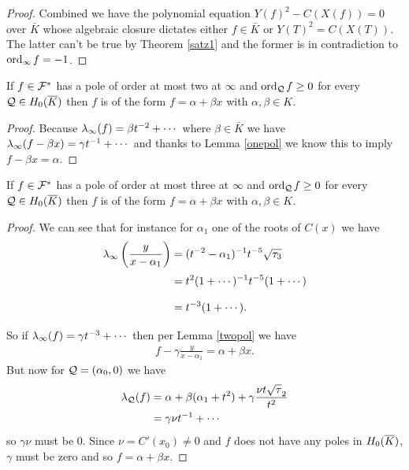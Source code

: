 \documentclass[english,11pt,a4paper]{article}
\begin{document}
\begin{lemma}
\begin{proof}
    Combined we have the polynomial equation $Y(f)^2 - C(X(f)) = 0$ over $\bar K$ whose algebraic closure dictates either $f \in \bar K$ or $Y(T)^2 = C(X(T))$. The latter can't be true by Theorem \ref{satz1} and the former is in contradiction to $\text{ord}_{\infty}\hspace{0.4mm} f = -1$.%
  \end{proof}
\end{lemma}

\begin{lemma}\label{twopol}
  If $f \in \mathcal{F}^*$ has a pole of order at most two at $\infty$ and $\text{ord}_{\mathcal{Q}}\hspace{0.4mm} f \geq 0$ for every $\mathcal{Q} \in H_0(\overline K)$ then $f$ is of the form $f = \alpha + \beta x$ with $\alpha, \beta \in K$.
  \begin{proof}
    Because $\lambda_{\infty} (f) = \beta t^{-2} + \cdots$ where $\beta \in \bar K$ we have $\lambda_{\infty} (f - \beta x)= \gamma t^{-1} + \cdots$ and thanks to Lemma \ref{onepol} we know this to imply $f - \beta x = \alpha$.
  \end{proof}
\end{lemma}

\begin{lemma}
  If $f \in \mathcal{F}^*$ has a pole of order at most three at $\infty$ and $\text{ord}_{\mathcal{Q}}\hspace{0.4mm} f \geq 0$ for every $\mathcal{Q} \in H_0(\overline K)$ then $f$ is of the form $f = \alpha + \beta x$ with $\alpha, \beta \in K$.
  \begin{proof}
    We can see that for instance for $\alpha_1$ one of the roots of $C(x)$ we have
    \begin{align*}
      \lambda_{\infty} \left(\frac{y}{x-\alpha_1}\right) &= (t^{-2} - \alpha_1)^{-1} t^{-5} \sqrt{\tau_3}\\
      \vphantom{\frac x y}
      &= t^2 (1 + \cdots)^{-1} t^{-5}(1 + \cdots)\\
      \vphantom{\frac x y}
      &= t^{-3} (1 + \cdots).
    \end{align*}
    So if $\lambda_{\infty} (f) = \gamma t^{-3} + \cdots$ then per Lemma \ref{twopol} we have
    \begin{align*}
      f - \gamma \frac{y}{x-\alpha_1} = \alpha + \beta x.
    \end{align*}
    But now for $\mathcal{Q} = (\alpha_0, 0)$ we have
    \begin{align*}
      \lambda_{\mathcal{Q}} (f) &= \alpha + \beta (\alpha_1 + t^2) + \gamma \frac{\nu t \sqrt \tau_2}{t^{2}}\\
      &= \gamma \nu t^{-1} + \cdots
    \end{align*}
    so $\gamma \nu$ must be 0. Since $\nu = C'(x_0) \neq 0$ and $f$ does not have any poles in $H_0(\overline K)$, $\gamma$ must be zero and so $f = \alpha + \beta x$.

  \end{proof}
\end{lemma}
\end{document}
